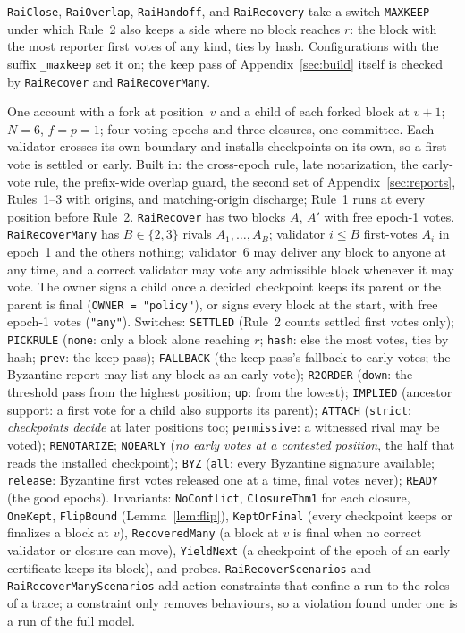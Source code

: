 \documentclass[conference]{IEEEtran}
\begin{document}
\texttt{RaiClose}, \texttt{RaiOverlap}, \texttt{RaiHandoff}, and \texttt{RaiRecovery} take a switch \texttt{MAXKEEP} under which Rule~2 also keeps a side where no block reaches $r$: the block with the most reporter first votes of any kind, ties by hash. Configurations with the suffix \texttt{\_maxkeep} set it on; the keep pass of Appendix~\ref{sec:build} itself is checked by \texttt{RaiRecover} and \texttt{RaiRecoverMany}.

One account with a fork at position~$v$ and a child of each forked block at $v+1$; $N=6$, $f=p=1$; four voting epochs and three closures, one committee. Each validator crosses its own boundary and installs checkpoints on its own, so a first vote is settled or early. Built in: the cross-epoch rule, late notarization, the early-vote rule, the prefix-wide overlap guard, the second set of Appendix~\ref{sec:reports}, Rules~1--3 with origins, and matching-origin discharge; Rule~1 runs at every position before Rule~2. \texttt{RaiRecover} has two blocks $A$, $A'$ with free epoch-1 votes. \texttt{RaiRecoverMany} has $B\in\{2,3\}$ rivals $A_1,\dots,A_B$; validator $i\le B$ first-votes $A_i$ in epoch~1 and the others nothing; validator~6 may deliver any block to anyone at any time, and a correct validator may vote any admissible block whenever it may vote. The owner signs a child once a decided checkpoint keeps its parent or the parent is final (\texttt{OWNER = "policy"}), or signs every block at the start, with free epoch-1 votes (\texttt{"any"}). Switches: \texttt{SETTLED} (Rule~2 counts settled first votes only); \texttt{PICKRULE} (\texttt{none}: only a block alone reaching $r$; \texttt{hash}: else the most votes, ties by hash; \texttt{prev}: the keep pass); \texttt{FALLBACK} (the keep pass's fallback to early votes; the Byzantine report may list any block as an early vote); \texttt{R2ORDER} (\texttt{down}: the threshold pass from the highest position; \texttt{up}: from the lowest); \texttt{IMPLIED} (ancestor support: a first vote for a child also supports its parent); \texttt{ATTACH} (\texttt{strict}: \emph{checkpoints decide} at later positions too; \texttt{permissive}: a witnessed rival may be voted); \texttt{RENOTARIZE}; \texttt{NOEARLY} (\emph{no early votes at a contested position}, the half that reads the installed checkpoint); \texttt{BYZ} (\texttt{all}: every Byzantine signature available; \texttt{release}: Byzantine first votes released one at a time, final votes never); \texttt{READY} (the good epochs). Invariants: \texttt{NoConflict}, \texttt{ClosureThm1} for each closure, \texttt{OneKept}, \texttt{FlipBound} (Lemma~\ref{lem:flip}), \texttt{KeptOrFinal} (every checkpoint keeps or finalizes a block at $v$), \texttt{RecoveredMany} (a block at $v$ is final when no correct validator or closure can move), \texttt{YieldNext} (a checkpoint of the epoch of an early certificate keeps its block), and probes. \texttt{RaiRecoverScenarios} and \texttt{RaiRecoverManyScenarios} add action constraints that confine a run to the roles of a trace; a constraint only removes behaviours, so a violation found under one is a run of the full model.
\end{document}
